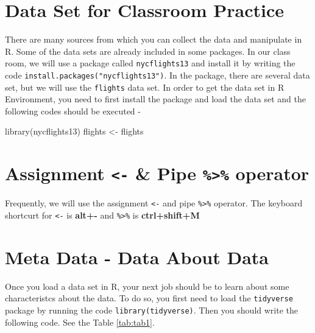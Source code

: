 \documentclass[
]{book}
\newenvironment{Shaded}{\begin{snugshade}}{\end{snugshade}}
\newcommand{\FunctionTok}[1]{\textcolor[rgb]{0.00,0.00,0.00}{#1}}
\newcommand{\NormalTok}[1]{#1}
\newcommand{\OtherTok}[1]{\textcolor[rgb]{0.56,0.35,0.01}{#1}}
\begin{document}
\hypertarget{data-set-for-classroom-practice}{%
\section{Data Set for Classroom Practice}\label{data-set-for-classroom-practice}}

There are many sources from which you can collect the data and manipulate in R. Some of the data sets are already included in some packages. In our class room, we will use a package called \texttt{nycflights13} and install it by writing the code \texttt{install.packages("nycflights13")}. In the package, there are several data set, but we will use the \texttt{flights} data set. In order to get the data set in R Environment, you need to first install the package and load the data set and the following codes should be executed -

\begin{Shaded}
\begin{Highlighting}[]
\FunctionTok{library}\NormalTok{(nycflights13)}
\NormalTok{flights }\OtherTok{\textless{}{-}}\NormalTok{ flights}
\end{Highlighting}
\end{Shaded}

\hypertarget{assignment---pipe-operator}{%
\section{\texorpdfstring{Assignment \texttt{\textless{}-} \& Pipe \texttt{\%\textgreater{}\%} operator}{Assignment \textless- \& Pipe \%\textgreater\% operator}}\label{assignment---pipe-operator}}

Frequently, we will use the assignment \texttt{\textless{}-} and pipe \texttt{\%\textgreater{}\%} operator. The keyboard shortcurt for \texttt{\textless{}-} is \textbf{alt+-} and \texttt{\%\textgreater{}\%} is \textbf{ctrl+shift+M}

\hypertarget{meta-data---data-about-data}{%
\section{Meta Data - Data About Data}\label{meta-data---data-about-data}}

Once you load a data set in R, your next job should be to learn about some characteristcs about the data. To do so, you first need to load the \texttt{tidyverse} package by running the code \texttt{library(tidyverse)}. Then you should write the following code. See the Table \ref{tab:tab1}.
\end{document}
